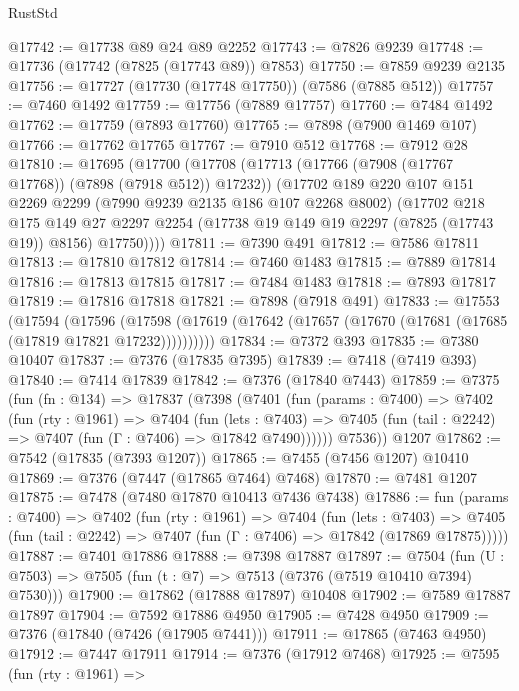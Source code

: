 \begin{lexlean}{RustStd}
\begin{coremodule}
@17742 := @17738 @89 @24 @89 @2252
@17743 := @7826 @9239
@17748 := @17736 (@17742 (@7825 (@17743 @89)) @7853)
@17750 := @7859 @9239 @2135
@17756 := @17727 (@17730 (@17748 @17750)) (@7586 (@7885 @512))
@17757 := @7460 @1492
@17759 := @17756 (@7889 @17757)
@17760 := @7484 @1492
@17762 := @17759 (@7893 @17760)
@17765 := @7898 (@7900 @1469 @107)
@17766 := @17762 @17765
@17767 := @7910 @512
@17768 := @7912 @28
@17810 := @17695
    (@17700
      (@17708
        (@17713 (@17766 (@7908 (@17767 @17768)) (@7898 (@7918 @512)) @17232))
        (@17702
          @189
          @220
          @107
          @151
          @2269
          @2299
          (@7990 @9239 @2135 @186 @107 @2268 @8002)
          (@17702
            @218
            @175
            @149
            @27
            @2297
            @2254
            (@17738 @19 @149 @19 @2297 (@7825 (@17743 @19)) @8156)
            @17750))))
@17811 := @7390 @491
@17812 := @7586 @17811
@17813 := @17810 @17812
@17814 := @7460 @1483
@17815 := @7889 @17814
@17816 := @17813 @17815
@17817 := @7484 @1483
@17818 := @7893 @17817
@17819 := @17816 @17818
@17821 := @7898 (@7918 @491)
@17833 := @17553
    (@17594
      (@17596
        (@17598 (@17619 (@17642 (@17657 (@17670 (@17681 (@17685 (@17819 @17821 @17232))))))))))
@17834 := @7372 @393
@17835 := @7380 @10407
@17837 := @7376 (@17835 @7395)
@17839 := @7418 (@7419 @393)
@17840 := @7414 @17839
@17842 := @7376 (@17840 @7443)
@17859 := @7375
    (fun (fn : @134) =>
    @17837
      (@7398
        (@7401
          (fun (params : @7400) =>
          @7402
            (fun (rty : @1961) =>
            @7404
              (fun (lets : @7403) =>
              @7405 (fun (tail : @2242) => @7407 (fun (Γ : @7406) => @17842 @7490))))))
        @7536))
    @1207
@17862 := @7542 (@17835 (@7393 @1207))
@17865 := @7455 (@7456 @1207) @10410
@17869 := @7376 (@7447 (@17865 @7464) @7468)
@17870 := @7481 @1207
@17875 := @7478 (@7480 @17870 @10413 @7436 @7438)
@17886 := fun (params : @7400) =>
  @7402
    (fun (rty : @1961) =>
    @7404
      (fun (lets : @7403) =>
      @7405 (fun (tail : @2242) => @7407 (fun (Γ : @7406) => @17842 (@17869 @17875)))))
@17887 := @7401 @17886
@17888 := @7398 @17887
@17897 := @7504
    (fun (U : @7503) => @7505 (fun (t : @7) => @7513 (@7376 (@7519 @10410 @7394) @7530)))
@17900 := @17862 (@17888 @17897) @10408
@17902 := @7589 @17887 @17897
@17904 := @7592 @17886 @4950
@17905 := @7428 @4950
@17909 := @7376 (@17840 (@7426 (@17905 @7441)))
@17911 := @17865 (@7463 @4950)
@17912 := @7447 @17911
@17914 := @7376 (@17912 @7468)
@17925 := @7595
    (fun (rty : @1961) =>

\end{coremodule}
\end{lexlean}
